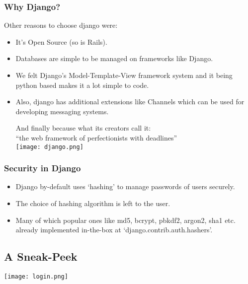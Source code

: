 \documentclass[hidelinks, a4paper,12pt, titlepage]{article}
\begin{document}
\subsubsection{Why Django?}
Other reasons to choose django were:
\begin{itemize}
\item It’s Open Source (so is Rails).
\item Databases are simple to be managed on frameworks like Django.
\item We felt Django’s Model-Template-View framework system and it being python based makes it a lot simple to code.
\item Also, django has additional extensions like Channels which can be used for developing messaging systems.
\vspace{10pt}
{\begin{center} 
And finally because what its creators call it: \\
``the web framework of perfectionists with deadlines''\\
\vspace{10pt}
\texttt{[image: django.png]}\flushright\cite{logo} \end{center}}
\end{itemize}
\subsubsection{Security in Django}
\begin{itemize}
\item Django by-default uses ‘hashing’ to manage passwords of users securely.
\item The choice of hashing algorithm is left to the user.
\item Many of which popular ones like md5, bcrypt, pbkdf2, argon2, sha1 etc. already implemented in-the-box at ‘django.contrib.auth.hashers’.\hspace{130pt}\cite{security}
\end{itemize}
\subsection{A Sneak-Peek}
\begin{center}\texttt{[image: login.png]}\end{center}
\end{document}

